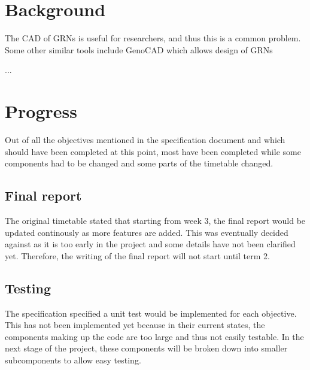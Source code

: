 \documentclass{article}
\begin{document}
	
	
	\section{Background}
	

	
	The CAD of GRNs is useful for researchers, and thus this is a common problem. Some other similar tools include GenoCAD which allows design of GRNs
	
	...
	
	
	
	\section{Progress}
	Out of all the objectives mentioned in the specification document and which should have been completed at this point, most have been completed while some components had to be changed and some parts of the timetable changed.
	
	
	
	\subsection{Final report} 
	The original timetable stated that starting from week 3, the final report would be updated continously as more features are added. This was eventually decided against as it is too early in the project and some details have not been clarified yet. Therefore, the writing of the final report will not start until term 2.
	
	\subsection{Testing} 
	The specification specified a unit test would be implemented for each objective. This has not been implemented yet because in their current states, the components making up the code are too large and thus not easily testable. In the next stage of the project, these components will be broken down into smaller subcomponents to allow easy testing.
	
\end{document}
